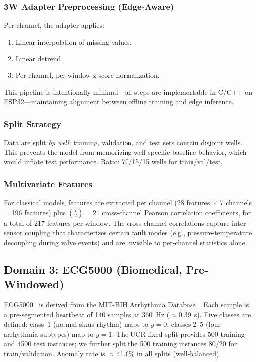 \documentclass[conference]{IEEEtran}
\begin{document}
\subsubsection{3W Adapter Preprocessing (Edge-Aware)}

Per channel, the adapter applies:
\begin{enumerate}
  \item Linear interpolation of missing values.
  \item Linear detrend.
  \item Per-channel, per-window z-score normalization.
\end{enumerate}

This pipeline is intentionally minimal---all steps are implementable
in C/C++ on ESP32---maintaining alignment between offline training
and edge inference.

\subsubsection{Split Strategy}

Data are split \emph{by well}: training, validation, and test sets
contain disjoint wells.
This prevents the model from memorizing well-specific baseline behavior,
which would inflate test performance.
Ratio: 70/15/15 wells for train/val/test.

\subsubsection{Multivariate Features}

For classical models, features are extracted per channel
(28 features $\times$ 7 channels = 196 features) plus
$\binom{7}{2} = 21$ cross-channel Pearson correlation coefficients,
for a total of 217 features per window.
The cross-channel correlations capture inter-sensor coupling that characterizes
certain fault modes (e.g., pressure-temperature decoupling during valve events)
and are invisible to per-channel statistics alone.

\subsection{Domain 3: ECG5000 (Biomedical, Pre-Windowed)}

ECG5000~\cite{goldberger2000physiobank} is derived from the MIT-BIH Arrhythmia
Database~\cite{moody2001impact}.
Each sample is a pre-segmented heartbeat of 140 samples at 360~Hz ($\approx$0.39~s).
Five classes are defined: class~1 (normal sinus rhythm) maps to $y=0$;
classes 2--5 (four arrhythmia subtypes) map to $y=1$.
The UCR fixed split provides 500 training and 4500 test instances;
we further split the 500 training instances 80/20 for train/validation.
Anomaly rate is $\approx$41.6\% in all splits (well-balanced).
\end{document}
